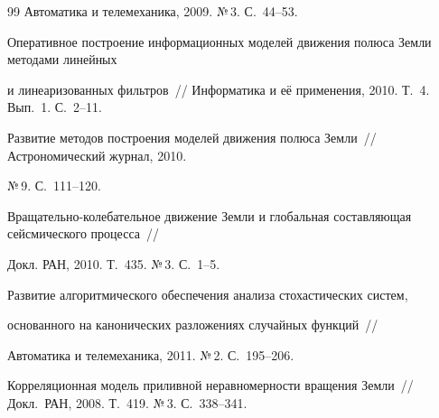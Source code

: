 {{\begin{thebibliography}{99}
Автоматика и телемеханика, 2009. №\,3. С.~44--53.









Оперативное построение информационных моделей движения полюса Земли методами линейных 


и линеаризованных фильтров~/\!\!/ Информатика и её применения, 2010. Т.~4. Вып.~1. С.~2--11.









Развитие методов построения моделей движения полюса Земли~/\!\!/ Астрономический журнал, 2010. 


№\,9. С.~111--120.









Вра\-ща\-тель\-но-ко\-ле\-ба\-тель\-ное движение Земли и глобальная составляющая сейсмического процесса~/\!\!/ 


Докл. РАН, 2010. Т.~435. №\,3. С.~1--5.









Развитие алгоритмического обеспечения анализа стохастических систем, 


основанного на канонических разложениях случайных функций~/\!\!/ 


Автоматика и телемеханика, 2011. №\,2. С.~195--206.









Корреляционная модель приливной не\-рав\-но\-мер\-ности вращения Земли~/\!\!/ Докл.\ РАН, 2008. Т.~419. №\,3. С.~338--341.






\end{thebibliography}}}
